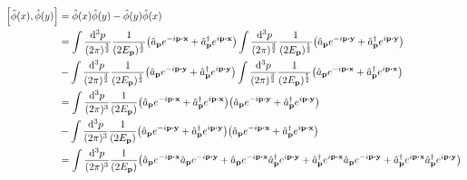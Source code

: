 \documentclass{article}
\begin{document}
\begin{align*}
    \bqty{\hat{\phi}(x),\hat{\phi}(y)} & =\hat{\phi}(x)\hat{\phi}(y)-\hat{\phi}(y)\hat{\phi}(x)                                                                                                                                                                                                                                                                                                                                                               \\
                                       & =\int\frac{\dd[3]{p}}{(2\pi)^{\frac{3}{2}}}\frac{1}{(2E_{\vb{p}})^{\frac{1}{2}}}\pqty{\hat{a}_{\vb{p}}e^{-i\vb{p}\vdot\vb{x}}+\hat{a}^\dagger_{\vb{p}}e^{i\vb{p}\vdot\vb{x}}}\int\frac{\dd[3]{p}}{(2\pi)^{\frac{3}{2}}}\frac{1}{(2E_{\vb{p}})^{\frac{1}{2}}}\pqty{\hat{a}_{\vb{p}}e^{-i\vb{p}\vdot\vb{y}}+\hat{a}^\dagger_{\vb{p}}e^{i\vb{p}\vdot\vb{y}}}                                                            \\
                                       & -\int\frac{\dd[3]{p}}{(2\pi)^{\frac{3}{2}}}\frac{1}{(2E_{\vb{p}})^{\frac{1}{2}}}\pqty{\hat{a}_{\vb{p}}e^{-i\vb{p}\vdot\vb{y}}+\hat{a}^\dagger_{\vb{p}}e^{i\vb{p}\vdot\vb{y}}}\int\frac{\dd[3]{p}}{(2\pi)^{\frac{3}{2}}}\frac{1}{(2E_{\vb{p}})^{\frac{1}{2}}}\pqty{\hat{a}_{\vb{p}}e^{-i\vb{p}\vdot\vb{x}}+\hat{a}^\dagger_{\vb{p}}e^{i\vb{p}\vdot\vb{x}}}                                                            \\
                                       & =\int\frac{\dd[3]{p}}{(2\pi)^3}\frac{1}{(2E_{\vb{p}})}\pqty{\hat{a}_{\vb{p}}e^{-i\vb{p}\vdot\vb{x}}+\hat{a}^\dagger_{\vb{p}}e^{i\vb{p}\vdot\vb{x}}}\pqty{\hat{a}_{\vb{p}}e^{-i\vb{p}\vdot\vb{y}}+\hat{a}^\dagger_{\vb{p}}e^{i\vb{p}\vdot\vb{y}}}                                                                                                                                                                     \\
                                       & -\int\frac{\dd[3]{p}}{(2\pi)^3}\frac{1}{(2E_{\vb{p}})}\pqty{\hat{a}_{\vb{p}}e^{-i\vb{p}\vdot\vb{y}}+\hat{a}^\dagger_{\vb{p}}e^{i\vb{p}\vdot\vb{y}}}\pqty{\hat{a}_{\vb{p}}e^{-i\vb{p}\vdot\vb{x}}+\hat{a}^\dagger_{\vb{p}}e^{i\vb{p}\vdot\vb{x}}}                                                                                                                                                                     \\
                                       & =\int\frac{\dd[3]{p}}{(2\pi)^3}\frac{1}{(2E_{\vb{p}})}\pqty{\hat{a}_{\vb{p}}e^{-i\vb{p}\vdot\vb{x}}\hat{a}_{\vb{p}}e^{-i\vb{p}\vdot\vb{y}}+\hat{a}_{\vb{p}}e^{-i\vb{p}\vdot\vb{x}}\hat{a}^\dagger_{\vb{p}}e^{i\vb{p}\vdot\vb{y}}+\hat{a}^\dagger_{\vb{p}}e^{i\vb{p}\vdot\vb{x}}\hat{a}_{\vb{p}}e^{-i\vb{p}\vdot\vb{y}}+\hat{a}^\dagger_{\vb{p}}e^{i\vb{p}\vdot\vb{x}}\hat{a}^\dagger_{\vb{p}}e^{i\vb{p}\vdot\vb{y}}} \\

\end{align*}
\end{document}
